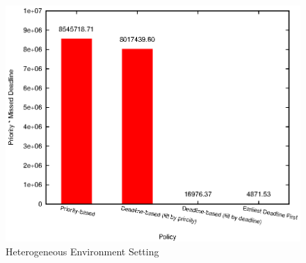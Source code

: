 \begin{figure}[htbp]
  \centering
  \includegraphics[width=\textwidth,height=0.7\textheight,keepaspectratio]{figures/hetero.eps}
  \caption{Heterogeneous Environment Setting}
  \label{fig:hetero-result}
\end{figure}
